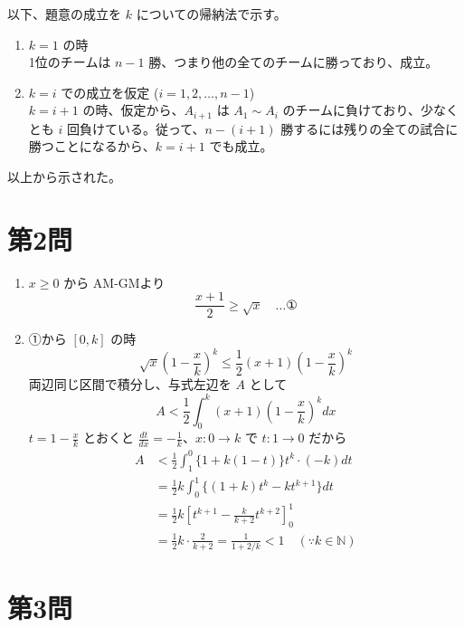 \documentclass[../main.tex]{subfiles}
\begin{document}
\noindent
以下、題意の成立を $k$ についての帰納法で示す。

\begin{enumerate}
  \item[$1^\circ$] $k=1$ の時\\
    1位のチームは $n-1$ 勝、つまり他の全てのチームに勝っており、成立。

  \item[$2^\circ$] $k=i$ での成立を仮定 ($i=1, 2, \dots, n-1$)\\
    $k=i+1$ の時、仮定から、$A_{i+1}$ は $A_1 \sim A_i$ のチームに負けており、少なくとも $i$ 回負けている。従って、$n-(i+1)$ 勝するには残りの全ての試合に勝つことになるから、$k=i+1$ でも成立。
\end{enumerate}

\noindent
以上から示された。

\newpage

\section*{第2問}

\noindent
[\textbf{解}]
\begin{enumerate}
  \item[(1)] $x \ge 0$ から AM-GMより
    \[
      \frac{x+1}{2} \ge \sqrt{x} \quad \dots \text{①}
    \]

  \item[(2)] ①から $[0, k]$ の時
    \[
      \sqrt{x}\left(1 - \frac{x}{k}\right)^k \le \frac{1}{2}(x+1)\left(1 - \frac{x}{k}\right)^k
    \]
    両辺同じ区間で積分し、与式左辺を $A$ として
    \[
      A < \frac{1}{2}\int_0^k (x+1)\left(1 - \frac{x}{k}\right)^k dx
    \]
    $t = 1 - \frac{x}{k}$ とおくと $\frac{dt}{dx} = -\frac{1}{k}$、$x : 0 \to k$ で $t : 1 \to 0$ だから
    \begin{align*}
      A &< \frac{1}{2} \int_1^0 \{1 + k(1-t)\} t^k \cdot (-k) dt \\
      &= \frac{1}{2} k \int_0^1 \{(1+k)t^k - k t^{k+1}\} dt \\
      &= \frac{1}{2} k \left[ t^{k+1} - \frac{k}{k+2} t^{k+2} \right]_0^1 \\
      &= \frac{1}{2} k \cdot \frac{2}{k+2} = \frac{1}{1 + 2/k} < 1 \quad (\because k \in \mathbb{N})
    \end{align*}
\end{enumerate}

\newpage

\section*{第3問}
\end{document}
